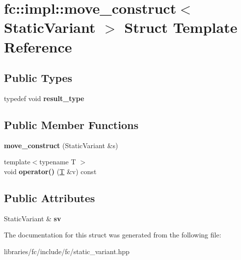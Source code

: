 \hypertarget{structfc_1_1impl_1_1move__construct}{}\section{fc\+:\+:impl\+:\+:move\+\_\+construct$<$ Static\+Variant $>$ Struct Template Reference}
\label{structfc_1_1impl_1_1move__construct}
\subsection*{Public Types}
\begin{DoxyCompactItemize}
\item 
\mbox{\label{structfc_1_1impl_1_1move__construct_a4014bb2d80aa37a7acf96a7a3cf28734}} 
typedef void {\bfseries result\+\_\+type}
\end{DoxyCompactItemize}
\subsection*{Public Member Functions}
\begin{DoxyCompactItemize}
\item 
\mbox{\label{structfc_1_1impl_1_1move__construct_a903955e3850798df208d8bde84783351}} 
{\bfseries move\+\_\+construct} (Static\+Variant \&s)
\item 
\mbox{\label{structfc_1_1impl_1_1move__construct_a5b59735cfc6d2f8fdff3744b0b7b7ac6}} 
{\footnotesize template$<$typename T $>$ }\\void {\bfseries operator()} (\mbox{\hyperlink{struct_t}{T}} \&v) const
\end{DoxyCompactItemize}
\subsection*{Public Attributes}
\begin{DoxyCompactItemize}
\item 
\mbox{\label{structfc_1_1impl_1_1move__construct_ab88daac353abdedbd8afd68231011daa}} 
Static\+Variant \& {\bfseries sv}
\end{DoxyCompactItemize}


The documentation for this struct was generated from the following file\+:\begin{DoxyCompactItemize}
\item 
libraries/fc/include/fc/static\+\_\+variant.\+hpp\end{DoxyCompactItemize}
